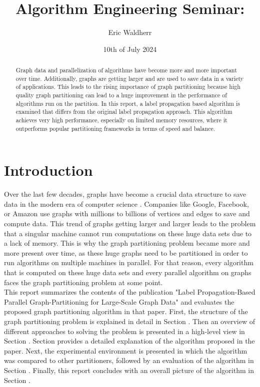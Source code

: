 \documentclass[acmsmall,nonacm,screen,review]{acmart}
\title{Algorithm Engineering Seminar: }
\author{Eric Waldherr}
\affiliation{%
  \institution{Heidelberg University}
  \streetaddress{Im Neuenheimer Feld 205}
  \city{Heidelberg}
  \state{Baden-Württemberg}
  \country{Germany}
  \postcode{69120}
}
\date{10th of July 2024}
\begin{document}
\begin{abstract}
Graph data and parallelization of algorithms have become more and more important over time. Additionally, graphs are getting larger and are used to save data in a variety of applications. This leads to the rising importance of graph partitioning because high quality graph partitioning can lead to a huge improvement in the performance of algorithms run on the partition. In this report, a label propagation based algorithm is examined that differs from the original label propagation approach. This algorithm achieves very high performance, especially on limited memory resources, where it outperforms popular partitioning frameworks in terms of speed and balance.
\end{abstract}
\maketitle

\section{Introduction}
Over the last few decades, graphs have become a crucial data structure to save data in the modern era of computer science \cite{Junghanns2017}. Companies like Google, Facebook, or Amazon use graphs with millions to billions of vertices and edges to save and compute data. This trend of graphs getting larger and larger leads to the problem that a singular machine cannot run computations on these huge data sets due to a lack of memory. This is why the graph partitioning problem became more and more present over time, as these huge graphs need to be partitioned in order to run algorithms on multiple machines in parallel. For that reason, every algorithm that is computed on these huge data sets and every parallel algorithm on graphs faces the graph partitioning problem at some point. \\
This report summarizes the contents of the publication "Label Propagation-Based Parallel Graph-Partitioning for Large-Scale Graph Data" \cite{Main} and evaluates the proposed graph partitioning algorithm in that paper. First, the structure of the graph partitioning problem is explained in detail in Section . Then an overview of different approaches to solving the problem is presented in a high-level view in Section . Section  provides a detailed explanation of the algorithm proposed in the paper. Next, the experimental environment is presented in which the algorithm was compared to other partitioners, followed by an evaluation of the algorithm in Section . Finally, this report concludes with an overall picture of the algorithm in Section .
\end{document}
